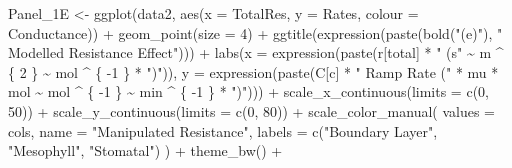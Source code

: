\documentclass[
]{krantz}
\makeatletter
\newenvironment{Shaded}{\begin{snugshade}}{\end{snugshade}}
\newcommand{\AttributeTok}[1]{\textcolor[rgb]{0.77,0.63,0.00}{#1}}
\newcommand{\DecValTok}[1]{\textcolor[rgb]{0.00,0.00,0.81}{#1}}
\newcommand{\FunctionTok}[1]{\textcolor[rgb]{0.00,0.00,0.00}{#1}}
\newcommand{\NormalTok}[1]{#1}
\newcommand{\OtherTok}[1]{\textcolor[rgb]{0.56,0.35,0.01}{#1}}
\newcommand{\SpecialCharTok}[1]{\textcolor[rgb]{0.00,0.00,0.00}{#1}}
\newcommand{\StringTok}[1]{\textcolor[rgb]{0.31,0.60,0.02}{#1}}
\newenvironment{kframe}{%
\medskip{}
\setlength{\fboxsep}{.8em}
 \def\at@end@of@kframe{}%
 \ifinner\ifhmode%
  \def\at@end@of@kframe{\end{minipage}}%
  \begin{minipage}{\columnwidth}%
 \fi\fi%
 \def\FrameCommand##1{\hskip\@totalleftmargin \hskip-\fboxsep
 \colorbox{shadecolor}{##1}\hskip-\fboxsep
     \hskip-\linewidth \hskip-\@totalleftmargin \hskip\columnwidth}%
 \MakeFramed {\advance\hsize-\width
   \@totalleftmargin\z@ \linewidth\hsize
   \@setminipage}}%
 {\par\unskip\endMakeFramed%
 \at@end@of@kframe}
\renewenvironment{Shaded}{\begin{kframe}}{\end{kframe}}
\makeatother
\begin{document}
\begin{Shaded}
\begin{Highlighting}[]
\NormalTok{Panel\_1E }\OtherTok{\textless{}{-}}
  \FunctionTok{ggplot}\NormalTok{(data2, }\FunctionTok{aes}\NormalTok{(}\AttributeTok{x =}\NormalTok{ TotalRes, }\AttributeTok{y =}\NormalTok{ Rates, }\AttributeTok{colour =}\NormalTok{ Conductance)) }\SpecialCharTok{+}
  \FunctionTok{geom\_point}\NormalTok{(}\AttributeTok{size =} \DecValTok{4}\NormalTok{) }\SpecialCharTok{+}
  \FunctionTok{ggtitle}\NormalTok{(}\FunctionTok{expression}\NormalTok{(}\FunctionTok{paste}\NormalTok{(}\FunctionTok{bold}\NormalTok{(}\StringTok{"(e)"}\NormalTok{), }\StringTok{" Modelled Resistance Effect"}\NormalTok{))) }\SpecialCharTok{+}
  \FunctionTok{labs}\NormalTok{(}\AttributeTok{x =} \FunctionTok{expression}\NormalTok{(}\FunctionTok{paste}\NormalTok{(r[total] }\SpecialCharTok{*} \StringTok{" (s"} \SpecialCharTok{\textasciitilde{}}\NormalTok{ m }\SpecialCharTok{\^{}}\NormalTok{ \{}
    \DecValTok{2}
\NormalTok{  \} }\SpecialCharTok{\textasciitilde{}}\NormalTok{ mol }\SpecialCharTok{\^{}}\NormalTok{ \{}
    \SpecialCharTok{{-}}\DecValTok{1}
\NormalTok{  \} }\SpecialCharTok{*} \StringTok{")"}\NormalTok{)), }
  \AttributeTok{y =} \FunctionTok{expression}\NormalTok{(}\FunctionTok{paste}\NormalTok{(C[c] }\SpecialCharTok{*} \StringTok{" Ramp Rate ("} \SpecialCharTok{*}\NormalTok{ mu }\SpecialCharTok{*}\NormalTok{ mol }\SpecialCharTok{\textasciitilde{}}\NormalTok{ mol }\SpecialCharTok{\^{}}
\NormalTok{                                    \{}
                                      \SpecialCharTok{{-}}\DecValTok{1}
\NormalTok{                                    \} }\SpecialCharTok{\textasciitilde{}}\NormalTok{ min }\SpecialCharTok{\^{}}\NormalTok{ \{}
                                      \SpecialCharTok{{-}}\DecValTok{1}
\NormalTok{                                    \} }\SpecialCharTok{*} \StringTok{")"}\NormalTok{))) }\SpecialCharTok{+}
  \FunctionTok{scale\_x\_continuous}\NormalTok{(}\AttributeTok{limits =} \FunctionTok{c}\NormalTok{(}\DecValTok{0}\NormalTok{, }\DecValTok{50}\NormalTok{)) }\SpecialCharTok{+}
  \FunctionTok{scale\_y\_continuous}\NormalTok{(}\AttributeTok{limits =} \FunctionTok{c}\NormalTok{(}\DecValTok{0}\NormalTok{, }\DecValTok{80}\NormalTok{)) }\SpecialCharTok{+}
  \FunctionTok{scale\_color\_manual}\NormalTok{(}
    \AttributeTok{values =}\NormalTok{ cols,}
    \AttributeTok{name =} \StringTok{"Manipulated Resistance"}\NormalTok{,}
    \AttributeTok{labels =} \FunctionTok{c}\NormalTok{(}\StringTok{"Boundary Layer"}\NormalTok{, }\StringTok{"Mesophyll"}\NormalTok{, }\StringTok{"Stomatal"}\NormalTok{)}
\NormalTok{  ) }\SpecialCharTok{+}
  \FunctionTok{theme\_bw}\NormalTok{() }\SpecialCharTok{+}

\end{Highlighting}
\end{Shaded}
\end{document}
